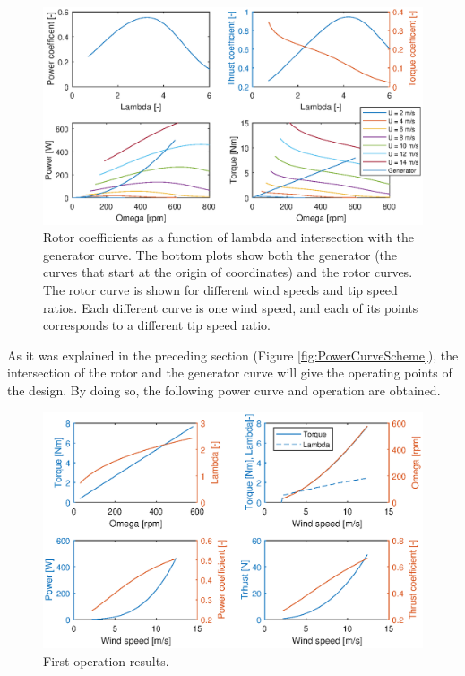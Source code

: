 \documentclass[../TFG_Report.tex]{subfiles}
\begin{document}
\begin{figure}[h!]
	\centering
	\includegraphics[width=1\linewidth]{Images/Aerodynamic_Design/First_Lambda_Results}
	\caption[Rotor coefficients as a function of lambda. Intersection with the generator curve. (first results)]{Rotor coefficients as a function of lambda and intersection with the generator curve. The bottom plots show both the generator (the curves that start at the origin of coordinates) and the rotor curves. The rotor curve is shown for different wind speeds and tip speed ratios. Each different curve is one wind speed, and each of its points corresponds to a different tip speed ratio.   }
	\label{fig:LambdaResultstFirst}
\end{figure}

\FloatBarrier

As it was explained in the preceding section (Figure \ref{fig:PowerCurveScheme}), the intersection of the rotor and the generator curve will give the operating points of the design. By doing so, the following power curve and operation are obtained.

\begin{figure}[h!]
	\centering
	\includegraphics[width=1\linewidth]{Images/Aerodynamic_Design/First_Operation_Results}
	\caption[First operation results]{First operation results. }
	\label{fig:OperationResultstFirst}
\end{figure} 
 \FloatBarrier
\end{document}
